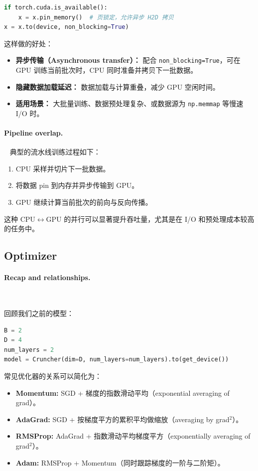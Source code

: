 \begin{lstlisting}[language=Python]
if torch.cuda.is_available():
    x = x.pin_memory()  # 页锁定，允许异步 H2D 拷贝
x = x.to(device, non_blocking=True)
\end{lstlisting}

\noindent
这样做的好处：
\begin{itemize}
  \item \textbf{异步传输（Asynchronous transfer）：} 配合 \texttt{non\_blocking=True}，可在 GPU 训练当前批次时，CPU 同时准备并拷贝下一批数据。
  \item \textbf{隐藏数据加载延迟：} 数据加载与计算重叠，减少 GPU 空闲时间。
  \item \textbf{适用场景：} 大批量训练、数据预处理复杂、或数据源为 \texttt{np.memmap} 等慢速 I/O 时。
\end{itemize}

\paragraph{Pipeline overlap.}~{}
典型的流水线训练过程如下：
\begin{enumerate}
  \item CPU 采样并切片下一批数据。
  \item 将数据 pin 到内存并异步传输到 GPU。
  \item GPU 继续计算当前批次的前向与反向传播。
\end{enumerate}
这种 CPU$\leftrightarrow$GPU 的并行可以显著提升吞吐量，尤其是在 I/O 和预处理成本较高的任务中。
 
\clearpage
\subsection{Optimizer}

\paragraph{Recap and relationships.}~{}

回顾我们之前的模型：
\begin{lstlisting}[language=Python]
B = 2
D = 4
num_layers = 2
model = Cruncher(dim=D, num_layers=num_layers).to(get_device())
\end{lstlisting}

常见优化器的关系可以简化为：
\begin{itemize}
  \item \textbf{Momentum:} SGD + 梯度的指数滑动平均（exponential averaging of grad）。
  \item \textbf{AdaGrad:} SGD + 按梯度平方的累积平均做缩放（averaging by grad$^2$）。
  \item \textbf{RMSProp:} AdaGrad + 指数滑动平均梯度平方（exponentially averaging of grad$^2$）。
  \item \textbf{Adam:} RMSProp + Momentum（同时跟踪梯度的一阶与二阶矩）。
\end{itemize}

